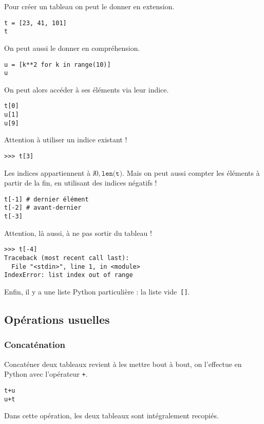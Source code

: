 \begin{multicols}{2}
Pour créer un tableau on peut le donner en extension.

\begin{lstlisting}
t = [23, 41, 101]
t
\end{lstlisting}

On peut aussi le donner en compréhension.

\begin{lstlisting}
u = [k**2 for k in range(10)]
u
\end{lstlisting}
On peut alors accéder à ses éléments via leur indice.
\begin{lstlisting}
t[0]
u[1]
u[9]
\end{lstlisting}

Attention à utiliser un indice existant !
\begin{lstlisting}
>>> t[3]
\end{lstlisting}

Les indices appartiennent à $\ii{0,\texttt{len(t)}}$.
Mais on peut aussi compter les éléments à partir de la fin, en utilisant des indices négatifs !
\begin{lstlisting}
t[-1] # dernier élément
t[-2] # avant-dernier
t[-3]
\end{lstlisting}

Attention, là aussi, à ne pas sortir du tableau !

\begin{lstlisting}
>>> t[-4]
Traceback (most recent call last):
  File "<stdin>", line 1, in <module>
IndexError: list index out of range
\end{lstlisting}

Enfin, il y a une liste Python particulière : la liste vide~\texttt{[]}.

\end{multicols}


\subsection{Opérations usuelles}

\subsubsection{Concaténation}
Concaténer deux tableaux revient à les mettre bout à bout, on l'effectue en Python avec 
l'opérateur \texttt{+}.
\begin{lstlisting}
t+u
u+t
\end{lstlisting}
Dans cette opération, les deux tableaux sont intégralement recopiés. 

